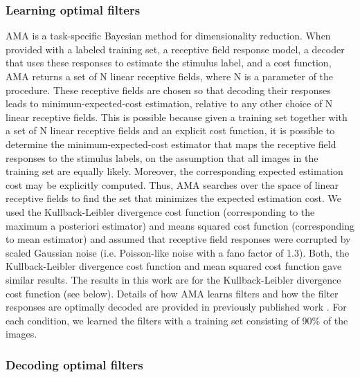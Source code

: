 \documentclass{jov}
\begin{document}
\subsubsection*{Learning optimal filters}
AMA is a task-specific Bayesian method for dimensionality reduction.
When provided with a labeled training set, a receptive field response model, a decoder that uses these responses to estimate the stimulus label, and a cost function, AMA returns a set of N linear receptive fields, where N is a parameter of the procedure.
These receptive fields are chosen so that decoding their responses leads to minimum-expected-cost estimation, relative to any other choice of N linear receptive fields.
This is possible because given a training set together with a set of N linear receptive fields and an explicit cost function, it is possible to determine the minimum-expected-cost estimator that maps the receptive field responses to the stimulus labels, on the assumption that all images in the training set are equally likely.
Moreover, the corresponding expected estimation cost may be explicitly computed.
Thus, AMA searches over the space of linear receptive fields to find the set that minimizes the expected estimation cost.
We used the Kullback-Leibler divergence cost function (corresponding to the maximum a posteriori estimator) and means squared cost function (corresponding to mean estimator) and assumed that receptive field responses were corrupted by scaled Gaussian noise (i.e. Poisson-like noise with a fano factor of 1.3).
Both, the Kullback-Leibler divergence cost function and mean squared cost function gave similar results.
The results in this work are for the Kullback-Leibler divergence cost function (see below).
Details of how AMA learns filters and how the filter responses are optimally decoded are provided in previously published work \cite{geisler2009optimal,burge2017accuracy,jaini2017linking}.
For each condition, we learned the filters with a training set consisting of 90\% of the images.

\subsubsection*{Decoding optimal filters}
\end{document}
